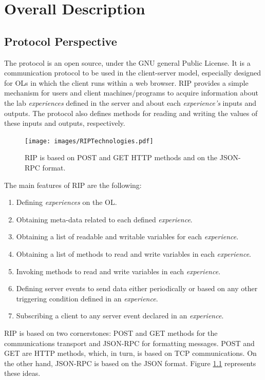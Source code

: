 \chapter{Overall Description}
\label{Overall Description}

\section{Protocol Perspective}
The protocol is an open source, under the GNU general Public License. It is a communication protocol to be used in the client-server model, especially designed for OLs in which the client runs within a web browser. RIP provides a simple mechanism for users and client machines/programs to acquire information about the lab \textit{experiences} defined in the server and about each \textit{experience's} inputs and outputs. The protocol also defines methods for reading and writing the values of these inputs and outputs, respectively.

\begin{figure}[b!]
\centering
\texttt{[image: images/RIPTechnologies.pdf]}
\caption{RIP is based on POST and GET HTTP methods and on the JSON-RPC format.}
\label{fig:RIP_Technologies}
\end{figure}

The main features of RIP are the following:

\begin{enumerate}
    \item Defining \textit{experiences} on the OL.
    \item Obtaining meta-data related to each defined \textit{experience}.
    \item Obtaining a list of readable and writable variables for each \textit{experience}.
    \item Obtaining a list of methods to read and write variables in each \textit{experience}.
    \item Invoking methods to read and write variables in each \textit{experience}.
    \item Defining server events to send data either periodically or based on any other triggering condition defined in an \textit{experience}.
    \item Subscribing a client to any server event declared in an \textit{experience}.
\end{enumerate}

RIP is based on two cornerstones: POST and GET methods for the communications transport and JSON-RPC for formatting messages. POST and GET are HTTP methods, which, in turn, is based on TCP communications. On the other hand, JSON-RPC is based on the JSON format. Figure \ref{fig:RIP_Technologies} represents these ideas.

